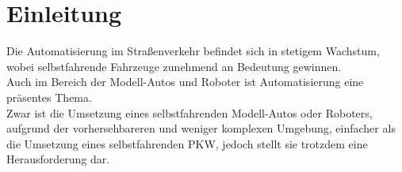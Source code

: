 \section{Einleitung}
Die Automatisierung im Straßenverkehr befindet sich in stetigem Wachstum, wobei selbstfahrende Fahrzeuge zunehmend an Bedeutung gewinnen. \\
Auch im Bereich der Modell-Autos und Roboter ist Automatisierung eine präsentes Thema. \\
Zwar ist die Umsetzung eines selbstfahrenden Modell-Autos oder Roboters, aufgrund der vorhersehbareren und weniger komplexen Umgebung, einfacher als die Umsetzung eines selbstfahrenden PKW, jedoch stellt sie trotzdem eine Herausforderung dar.